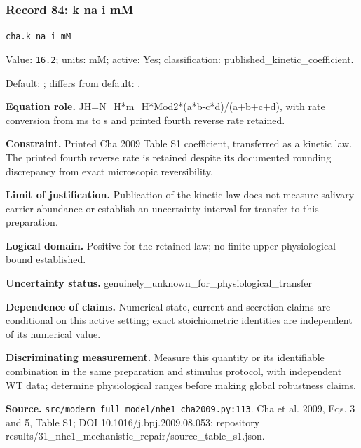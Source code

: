 \subsubsection*{Record 84: k na i mM}
{\small \nolinkurl{cha.k_na_i_mM}\par

Value: \texttt{16.2}; units: mM; active: Yes; classification: published\_kinetic\_coefficient.\par

Default: ; differs from default: .\par

\textbf{Equation role.} JH=N\_H*m\_H*Mod2*(a*b-c*d)/(a+b+c+d), with rate conversion from ms to s and printed fourth reverse rate retained.\par

\textbf{Constraint.} Printed Cha 2009 Table S1 coefficient, transferred as a kinetic law. The printed fourth reverse rate is retained despite its documented rounding discrepancy from exact microscopic reversibility.\par

\textbf{Limit of justification.} Publication of the kinetic law does not measure salivary carrier abundance or establish an uncertainty interval for transfer to this preparation.\par

\textbf{Logical domain.} Positive for the retained law; no finite upper physiological bound established.\par

\textbf{Uncertainty status.} genuinely\_unknown\_for\_physiological\_transfer\par

\textbf{Dependence of claims.} Numerical state, current and secretion claims are conditional on this active setting; exact stoichiometric identities are independent of its numerical value.\par

\textbf{Discriminating measurement.} Measure this quantity or its identifiable combination in the same preparation and stimulus protocol, with independent WT data; determine physiological ranges before making global robustness claims.\par

\textbf{Source.} \nolinkurl{src/modern_full_model/nhe1_cha2009.py:113}. Cha et al. 2009, Eqs. 3 and 5, Table S1; DOI 10.1016/j.bpj.2009.08.053; repository results/31\_nhe1\_mechanistic\_repair/source\_table\_s1.json.\par}


